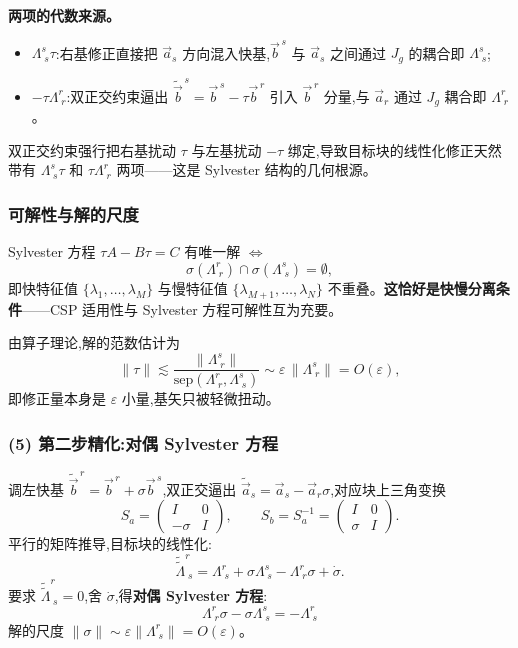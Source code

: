 \documentclass[11pt,a4paper]{article}
\newcommand{\Jg}{J_{\!g}}
\begin{document}
\textbf{两项的代数来源。}
\begin{itemize}[leftmargin=2em]
\item $\Lambda^{s}_{\;s}\tau$:右基修正直接把 $\vec a_s$ 方向混入快基,$\vec b^{\,s}$ 与 $\vec a_s$ 之间通过 $\Jg$ 的耦合即 $\Lambda^{s}_{\;s}$;
\item $-\tau\Lambda^{r}_{\;r}$:双正交约束逼出 $\tilde{\vec b}^{\,s}=\vec b^{\,s}-\tau\vec b^{\,r}$ 引入 $\vec b^{\,r}$ 分量,与 $\vec a_r$ 通过 $\Jg$ 耦合即 $\Lambda^{r}_{\;r}$。
\end{itemize}
双正交约束强行把右基扰动 $\tau$ 与左基扰动 $-\tau$ 绑定,导致目标块的线性化修正天然带有 $\Lambda^{s}_{\;s}\tau$ 和 $\tau\Lambda^{r}_{\;r}$ 两项——这是 Sylvester 结构的几何根源。

\subsubsection*{可解性与解的尺度}

Sylvester 方程 $\tau A-B\tau=C$ 有唯一解 $\Longleftrightarrow$
\begin{equation}
\sigma(\Lambda^{r}_{\;r})\cap\sigma(\Lambda^{s}_{\;s})=\emptyset,
\end{equation}
即快特征值 $\{\lambda_1,\dots,\lambda_M\}$ 与慢特征值 $\{\lambda_{M+1},\dots,\lambda_N\}$ 不重叠。\textbf{这恰好是快慢分离条件}——CSP 适用性与 Sylvester 方程可解性互为充要。

由算子理论,解的范数估计为
\begin{equation}
\|\tau\|\lesssim\frac{\|\Lambda^{s}_{\;r}\|}{\mathrm{sep}(\Lambda^{r}_{\;r},\Lambda^{s}_{\;s})}\sim\varepsilon\,\|\Lambda^{s}_{\;r}\|=O(\varepsilon),
\end{equation}
即修正量本身是 $\varepsilon$ 小量,基矢只被轻微扭动。

\subsubsection*{(5) 第二步精化:对偶 Sylvester 方程}

调左快基 $\tilde{\vec b}^{\,r}=\vec b^{\,r}+\sigma\vec b^{\,s}$,双正交逼出 $\tilde{\vec a}_s=\vec a_s-\vec a_r\sigma$,对应块上三角变换
\begin{equation}
S_a=\begin{pmatrix}I & 0\\ -\sigma & I\end{pmatrix},\qquad S_b=S_a^{-1}=\begin{pmatrix}I & 0\\ \sigma & I\end{pmatrix}.
\end{equation}
平行的矩阵推导,目标块的线性化:
\begin{equation}
\widetilde{\widetilde\Lambda}^{r}_{\;s}=\Lambda^{r}_{\;s}+\sigma\Lambda^{s}_{\;s}-\Lambda^{r}_{\;r}\sigma+\dot\sigma.
\end{equation}
要求 $\widetilde{\widetilde\Lambda}^{r}_{\;s}=0$,舍 $\dot\sigma$,得\textbf{对偶 Sylvester 方程}:
\begin{equation}
\boxed{\;\Lambda^{r}_{\;r}\sigma-\sigma\Lambda^{s}_{\;s}=-\Lambda^{r}_{\;s}\;}
\end{equation}
解的尺度 $\|\sigma\|\sim\varepsilon\|\Lambda^{r}_{\;s}\|=O(\varepsilon)$。
\end{document}
